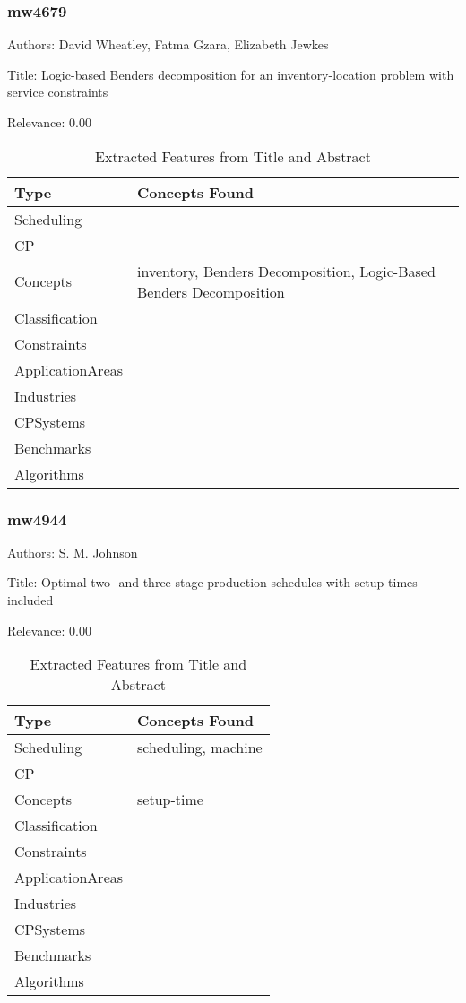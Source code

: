 \subsubsection{mw4679}
\label{mw:mw4679}

Authors: David Wheatley, Fatma Gzara, Elizabeth Jewkes

Title: Logic-based Benders decomposition for an inventory-location problem with service constraints

Relevance:  0.00

{\scriptsize
\begin{longtable}{p{2cm}p{20cm}}
\caption{Extracted Features from Title and Abstract}\\ \toprule
Type & Concepts Found\\ \midrule
\endhead
\bottomrule
\endfoot
Scheduling & \\ 
CP & \\ 
Concepts & inventory, Benders Decomposition, Logic-Based Benders Decomposition\\ 
Classification & \\ 
Constraints & \\ 
ApplicationAreas & \\ 
Industries & \\ 
CPSystems & \\ 
Benchmarks & \\ 
Algorithms & \\ 
\end{longtable}
}



\subsubsection{mw4944}
\label{mw:mw4944}

Authors: S. M. Johnson

Title: Optimal two‐ and three‐stage production schedules with setup times included

Relevance:  0.00

{\scriptsize
\begin{longtable}{p{2cm}p{20cm}}
\caption{Extracted Features from Title and Abstract}\\ \toprule
Type & Concepts Found\\ \midrule
\endhead
\bottomrule
\endfoot
Scheduling & scheduling, machine\\ 
CP & \\ 
Concepts & setup-time\\ 
Classification & \\ 
Constraints & \\ 
ApplicationAreas & \\ 
Industries & \\ 
CPSystems & \\ 
Benchmarks & \\ 
Algorithms & \\ 
\end{longtable}
}

